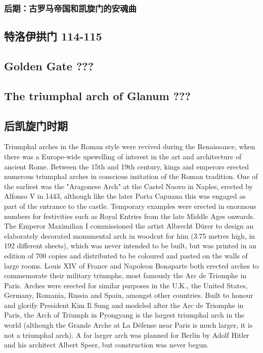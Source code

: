 \documentclass[a4paper,dvipdfm]{article}
\begin{document}
\subsubsection{后期：古罗马帝国和凯旋门的安魂曲}



\subsection{特洛伊拱门 114-115}

\subsection{Golden Gate ???}
\label{sec:golden-gate-}

\subsection{The triumphal arch of Glanum ???}
\label{sec:triumph-arch-glan}



\subsection{后凯旋门时期}

Triumphal arches in the Roman style were revived during the
Renaissance, when there was a Europe-wide upswelling of interest in
the art and architecture of ancient Rome. Between the 15th and 19th
century, kings and emperors erected numerous triumphal arches in
conscious imitation of the Roman tradition. One of the earliest was
the "Aragonese Arch" at the Castel Nuovo in Naples, erected by Alfonso
V in 1443, although like the later Porta Capuana this was engaged as
part of the entrance to the castle. Temporary examples were erected in
enormous numbers for festivities such as Royal Entries from the late
Middle Ages onwards. The Emperor Maximilian I commissioned the artist
Albrecht Dürer to design an elaborately decorated monumental arch in
woodcut for him (3.75 metres high, in 192 different sheets), which was
never intended to be built, but was printed in an edition of 700
copies and distributed to be coloured and pasted on the walls of large
rooms. Louis XIV of France and Napoleon Bonaparte both erected arches
to commemorate their military triumphs, most famously the Arc de
Triomphe in Paris. Arches were erected for similar purposes in the
U.K., the United States, Germany, Romania, Russia and Spain, amongst
other countries. Built to honour and glorify President Kim Il Sung and
modeled after the Arc de Triomphe in Paris, the Arch of Triumph in
Pyongyang is the largest triumphal arch in the world (although the
Grande Arche at La Défense near Paris is much larger, it is not a
triumphal arch). A far larger arch was planned for Berlin by Adolf
Hitler and his architect Albert Speer, but construction was never
begun.
\end{document}
